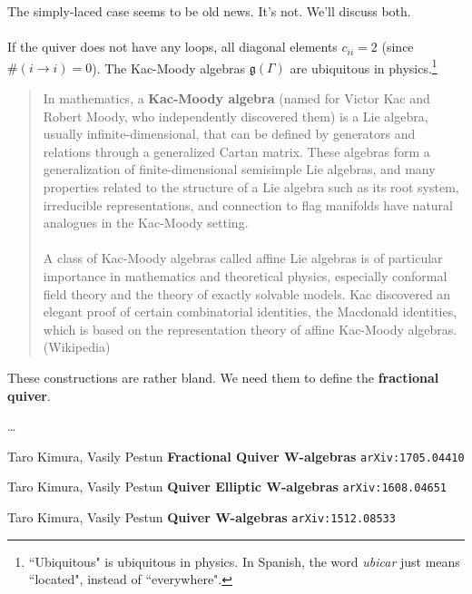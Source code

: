 \documentclass[12pt]{article}
\begin{document}
The simply-laced case seems to be old news.  It's not.  We'll discuss both. \\ \\
If the quiver does not have any loops, all diagonal elements $c_{ii} = 2$ (since $\# (i \to i) = 0$).  The Kac-Moody algebras $\mathfrak{g}(\Gamma)$ are ubiquitous in physics.\footnote{``Ubiquitous" is ubiquitous in physics.  In Spanish, the word \textit{ubicar} just means ``located", instead of ``everywhere".} 
\selectfont \fontsize{10}{15}\selectfont
\begin{quotation}
In mathematics, a \textbf{Kac-Moody algebra} (named for {\color{green!50!white!80!black}Victor Kac} and {\color{blue!50!white}Robert Moody}, who independently discovered them) is a Lie algebra, usually infinite-dimensional, that can be defined by generators and relations through a generalized Cartan matrix. These algebras form a generalization of finite-dimensional semisimple Lie algebras, and many properties related to the structure of a Lie algebra such as its root system, irreducible representations, and connection to flag manifolds have natural analogues in the Kac-Moody setting. \\ \\
A class of Kac-Moody algebras called affine Lie algebras is of particular importance in mathematics and theoretical physics, especially conformal field theory and the theory of exactly solvable models. Kac discovered an elegant proof of certain combinatorial identities, the Macdonald identities, which is based on the representation theory of affine Kac-Moody algebras. \hfill (Wikipedia)
\end{quotation}
\selectfont \fontsize{12.5}{15}\selectfont
These constructions are rather bland.  We need them to define the \textbf{fractional quiver}.
\newpage

\noindent \dots 

\vfill

\begin{thebibliography}{}

\item Taro Kimura, Vasily Pestun \textbf{Fractional Quiver W-algebras} \texttt{arXiv:1705.04410}

\item Taro Kimura, Vasily Pestun \textbf{Quiver Elliptic W-algebras} \texttt{arXiv:1608.04651}

\item Taro Kimura, Vasily Pestun \textbf{Quiver W-algebras} \texttt{arXiv:1512.08533}






\end{thebibliography}
\end{document}
